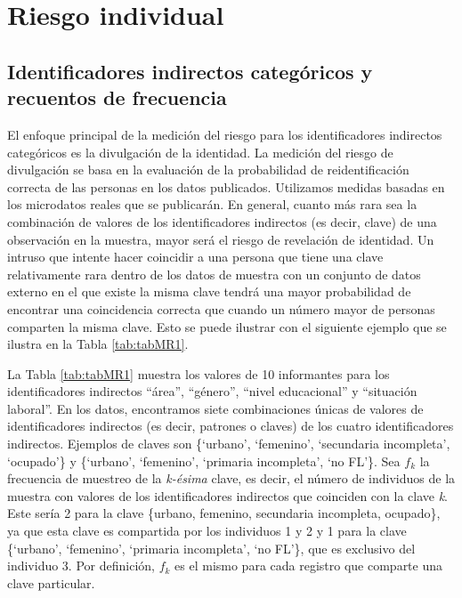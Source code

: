 \documentclass[
]{book}
\theoremstyle{definition}
\theoremstyle{definition}
\theoremstyle{definition}
\theoremstyle{definition}
\theoremstyle{remark}
\begin{document}
\hypertarget{riesgo-individual}{%
\section{Riesgo individual}\label{riesgo-individual}}

\hypertarget{identificadores-indirectos-categuxf3ricos-y-recuentos-de-frecuencia}{%
\subsection{Identificadores indirectos categóricos y recuentos de frecuencia}\label{identificadores-indirectos-categuxf3ricos-y-recuentos-de-frecuencia}}

El enfoque principal de la medición del riesgo para los identificadores indirectos categóricos es la divulgación de la identidad. La medición del riesgo de divulgación se basa en la evaluación de la probabilidad de reidentificación correcta de las personas en los datos publicados. Utilizamos medidas basadas en los microdatos reales que se publicarán. En general, cuanto más rara sea la combinación de valores de los identificadores indirectos (es decir, clave) de una observación en la muestra, mayor será el riesgo de revelación de identidad. Un intruso que intente hacer coincidir a una persona que tiene una clave relativamente rara dentro de los datos de muestra con un conjunto de datos externo en el que existe la misma clave tendrá una mayor probabilidad de encontrar una coincidencia correcta que cuando un número mayor de personas comparten la misma clave. Esto se puede ilustrar con el siguiente ejemplo que se ilustra en la Tabla \ref{tab:tabMR1}.

La Tabla \ref{tab:tabMR1} muestra los valores de 10 informantes para los identificadores indirectos ``área'', ``género'', ``nivel educacional'' y ``situación laboral''. En los datos, encontramos siete combinaciones únicas de valores de identificadores indirectos (es decir, patrones o claves) de los cuatro identificadores indirectos. Ejemplos de claves son \{`urbano', `femenino', `secundaria incompleta', `ocupado'\} y \{`urbano', `femenino', `primaria incompleta', `no FL'\}. Sea \(f_{k}\) la frecuencia de muestreo de la \emph{k-ésima} clave, es decir, el número de individuos de la muestra con valores de los identificadores indirectos que coinciden con la clave \emph{k}. Este sería 2 para la clave \{urbano, femenino, secundaria incompleta, ocupado\}, ya que esta clave es compartida por los individuos 1 y 2 y 1 para la clave \{`urbano', `femenino', `primaria incompleta', `no FL'\}, que es exclusivo del individuo 3. Por definición, \(f_{k}\) es el mismo para cada registro que comparte una clave particular.
\end{document}
